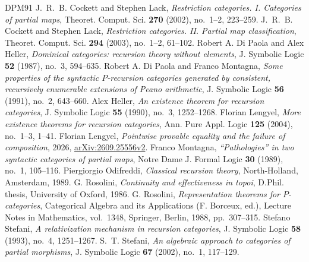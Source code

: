 \documentclass[letterpaper,10pt]{amsart}
\theoremstyle{plain}
\theoremstyle{definition}
\begin{document}
\begin{thebibliography}{DPM91}
J.~R.~B. Cockett and Stephen Lack, \textit{Restriction categories. I.
Categories of partial maps}, Theoret. Comput. Sci. \textbf{270} (2002),
no.~1--2, 223--259.
J.~R.~B. Cockett and Stephen Lack, \textit{Restriction categories. II.
Partial map classification}, Theoret. Comput. Sci. \textbf{294} (2003),
no.~1--2, 61--102.
Robert A. Di Paola and Alex Heller, \textit{Dominical categories: recursion
theory without elements}, J. Symbolic Logic \textbf{52} (1987), no.~3, 594--635.
Robert A. Di Paola and Franco Montagna, \textit{Some properties of the
syntactic $P$-recursion categories generated by consistent, recursively
enumerable extensions of Peano arithmetic}, J. Symbolic Logic
\textbf{56} (1991), no.~2, 643--660.
Alex Heller, \textit{An existence theorem for recursion categories},
J. Symbolic Logic \textbf{55} (1990), no.~3, 1252--1268.
Florian Lengyel, \textit{More existence theorems for recursion categories},
Ann. Pure Appl. Logic \textbf{125} (2004), no.~1--3, 1--41.
Florian Lengyel, \textit{Pointwise provable equality and the failure of
composition}, 2026, \href{https://arxiv.org/abs/2609.25556v2}{arXiv:2609.25556v2}.
Franco Montagna, \textit{``Pathologies'' in two syntactic categories of
partial maps}, Notre Dame J. Formal Logic \textbf{30} (1989), no.~1, 105--116.
Piergiorgio Odifreddi, \textit{Classical recursion theory}, North-Holland,
Amsterdam, 1989.
G. Rosolini, \textit{Continuity and effectiveness in topoi}, D.Phil.
thesis, University of Oxford, 1986.
G. Rosolini, \textit{Representation theorems for $P$-categories},
Categorical Algebra and its Applications (F. Borceux, ed.), Lecture Notes
in Mathematics, vol.~1348, Springer, Berlin, 1988, pp.~307--315.
Stefano Stefani, \textit{A relativization mechanism in recursion categories},
J. Symbolic Logic \textbf{58} (1993), no.~4, 1251--1267.
S.~T. Stefani, \textit{An algebraic approach to categories of partial
morphisms}, J. Symbolic Logic \textbf{67} (2002), no.~1, 117--129.
\end{thebibliography}
\end{document}
